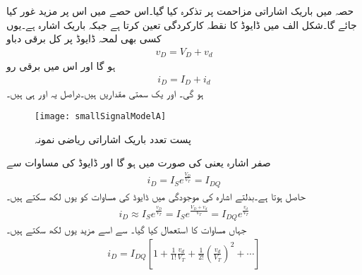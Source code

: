 حصہ   میں باریک اشاراتی مزاحمت  پر تذکرہ کیا گیا۔اس حصے میں اس پر مزید غور کیا جائے گا۔شکل  الف میں   ڈایوڈ کا نقطہ کارکردگی تعین کرتا ہے جبکہ  باریک اشارہ ہے۔یوں کسی بھی لمحہ ڈایوڈ پر کل برقی دباو
\begin{align}
v_D=V_D+v_d
\end{align}
ہو گا اور اس میں برقی رو
\begin{align}
i_D=I_D+i_d
\end{align}
ہو گی۔  اور  یک سمتی مقداریں ہیں۔دراصل یہ  اور  ہی ہیں۔
\begin{figure}
\centering
\texttt{[image: smallSignalModelA]}
\caption{پست تعدد باریک اشاراتی ریاضی نمونہ}
\label{شکل_باریک_اشاراتی_ماڈل}
\end{figure}
صفر اشارہ یعنی  کی صورت میں  ہو گا اور ڈایوڈ کی مساوات سے
\begin{align} \label{مساوات_ڈایوڈ_صفر_اشارہ_پر_رو}
i_D=I_S e^{\frac{V_D}{V_T}}=I_{DQ}
\end{align}
حاصل ہوتا ہے۔بدلتے اشارہ کی موجودگی میں ڈایوڈ کی مساوات کو یوں لکھ سکتے ہیں۔
\begin{align}
i_D \approx I_S e^{\frac{v_D}{V_T}} = I_S e^{\frac{V_D+v_d}{V_T}}=I_{DQ} e^{\frac{v_d}{V_T}}
\end{align}
جہاں مساوات   کا استعمال کیا گیا۔  سے اسے مزید  یوں لکھ سکتے ہیں۔
\begin{align}
i_D=I_{DQ} \left[1+ \frac{1}{1!} \frac{v_d}{V_T}+ \frac{1}{2!} \left (\frac{v_d}{V_T} \right )^{2} +\cdots \right ]
\end{align}

